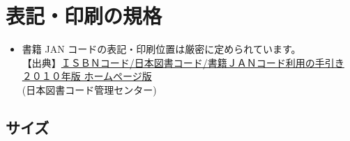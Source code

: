 \documentclass[a5j,tombo,10pt,titlepage,pdfusetitle]{ltjsbook}
\def\fs#1#2{\fontsize{#1}{#2}\selectfont }
\begin{document}
\newpage
\section{表記・印刷の規格} 

\begin{itemize}
  \item 書籍 JAN コードの表記・印刷位置は厳密に定められています。\\
{\fs{6}{6}【出典】\href{https://isbn.jpo.or.jp/doc/08.pdf}{ＩＳＢＮコード/日本図書コード/書籍ＪＡＮコード利用の手引き ２０１０年版 ホームページ版}\vspace{-2mm}\\
\hspace{7mm}(日本図書コード管理センター)}

\end{itemize}

\subsection{サイズ} 
\end{document}
